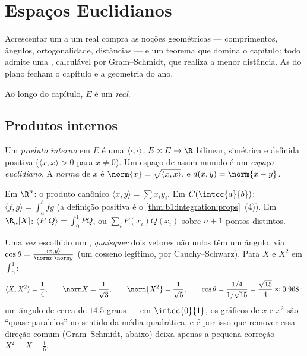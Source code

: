\chapter{Espaços Euclidianos}\label{ch:b1:euclid}

Acrescentar um  a um  real compra as
noções geométricas --- comprimentos, ângulos, ortogonalidade,
distâncias --- e um teorema que domina o capítulo: todo 
admite uma , calculável por Gram--Schmidt, que
realiza a menor distância. As  do plano fecham o capítulo
e a geometria do ano.

Ao longo do capítulo, $E$ é um  \emph{real}.

\section{Produtos internos}

\begin{definition}\label{def:b1:euclid:def}
Um \emph{produto interno} em $E$ é uma
 $\langle\cdot,\cdot\rangle \colon E \times E \to \R$ bilinear, simétrica e definida positiva ($\langle x, x\rangle >
0$ para
$x \neq 0$). Um espaço de  assim munido é um \emph{espaço
euclidiano}. A \emph{norma} de $x$ é $\norm{x} = \sqrt{\langle x, x\rangle}$,
e $d(x, y) =
\norm{x - y}$.
\end{definition}

\begin{example}\label{ex:b1:euclid:examples}
Em $\R^n$: o produto canônico $\langle x, y\rangle = \sum x_i
y_i$. Em $C(\intcc{a}{b})$: $\langle f, g \rangle = \int_a^b fg$ (a definição
positiva é o \cref{thm:b1:integration:props}~(4)). Em $\R_n[X]$: $\langle P, Q\rangle = \int_0^1 PQ$, ou $\sum_{i}
P(x_i)Q(x_i)$ sobre $n+1$
pontos distintos.
\end{example}

\begin{example}
\label{ex:b1:euclid:polyangle}
Uma vez escolhido um , \emph{quaisquer} dois vetores
não nulos têm um ângulo, via $\cos\theta = \frac{\langle x,
y\rangle}{\norm x\,\norm y}$ (um cosseno legítimo, por
Cauchy--Schwarz). Para $X$ e $X^2$ em $\int_0^1$:
\[
\langle X, X^2\rangle = \frac14, \qquad
\norm X = \frac1{\sqrt3}, \qquad \norm{X^2} = \frac1{\sqrt5},
\qquad
\cos\theta = \frac{1/4}{1/\sqrt{15}} = \frac{\sqrt{15}}{4}
\approx 0.968 :
\]
um ângulo de cerca de $14.5$ graus --- em $\intcc{0}{1}$, os gráficos de $x$
e $x^2$ são ``quase paralelos'' no sentido da média quadrática, e é
por isso que remover essa direção comum (Gram--Schmidt, abaixo)
deixa apenas a pequena correção $X^2 - X + \frac16$.
\end{example}

